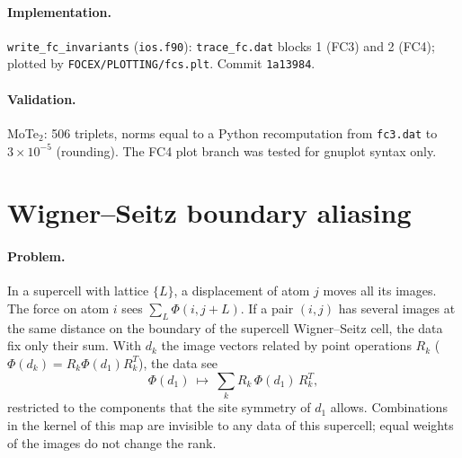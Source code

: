 \documentclass[11pt,a4paper]{article}
\newcommand{\code}[1]{\texttt{#1}}
\begin{document}
\paragraph{Implementation.} \code{write\_fc\_invariants} (\code{ios.f90}): \code{trace\_fc.dat} blocks 1
(FC3) and 2 (FC4); plotted by \code{FOCEX/PLOTTING/fcs.plt}. Commit \code{1a13984}.

\paragraph{Validation.} MoTe$_2$: 506 triplets, norms equal to a Python recomputation from \code{fc3.dat} to
$3\times10^{-5}$ (rounding). The FC4 plot branch was tested for gnuplot syntax only.

\section{Wigner--Seitz boundary aliasing}\label{sec:ws}
\paragraph{Problem.} In a supercell with lattice $\{L\}$, a displacement of atom $j$ moves all its images. The
force on atom $i$ sees $\sum_L\Phi(i,j+L)$. If a pair $(i,j)$ has several images at the same distance on the
boundary of the supercell Wigner--Seitz cell, the data fix only their sum. With $d_k$ the image vectors
related by point operations $R_k$ ($\Phi(d_k)=R_k\Phi(d_1)R_k^T$), the data see
\begin{equation}
\Phi(d_1)\ \mapsto\ \sum_kR_k\,\Phi(d_1)\,R_k^T ,
\end{equation}
restricted to the components that the site symmetry of $d_1$ allows. Combinations in the kernel of this map
are invisible to any data of this supercell; equal weights of the images do not change the rank.
\end{document}
